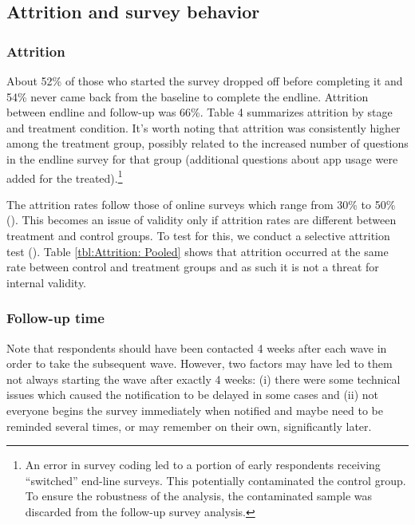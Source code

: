 \subsection{Attrition and survey behavior}

\subsubsection*{Attrition}

About 52\% of those who started the survey dropped off before completing it and 54\% never came back from the baseline to complete the endline. Attrition between endline and follow-up was 66\%. Table 4 summarizes attrition by stage and treatment condition. It’s worth noting that attrition was consistently higher among the treatment group, possibly related to the increased number of questions in the endline survey for that group (additional questions about app usage were added for the treated).\footnote{An error in survey coding led to a portion of early respondents receiving “switched” end-line surveys. This potentially contaminated the control group. To ensure the robustness of the analysis, the contaminated sample was discarded from the follow-up survey analysis.}

The attrition rates follow those of online surveys which range from 30\% to 50\% (\cite{zhou2016pitfall}). This becomes an issue of validity only if attrition rates are different between treatment and control groups. To test for this, we conduct a selective attrition test (\cite{ghanem2023testing}). Table \ref{tbl:Attrition: Pooled} shows that attrition occurred at the same rate between control and treatment groups and as such it is not a threat for internal validity.





\subsubsection*{Follow-up time}
Note that respondents should have been contacted 4 weeks after each wave in order to take the subsequent wave. However, two factors may have led to them not always starting the wave after exactly 4 weeks: (i) there were some technical issues which caused the notification to be delayed in some cases and (ii) not everyone begins the survey immediately when notified and maybe need to be reminded several times, or may remember on their own, significantly later.

